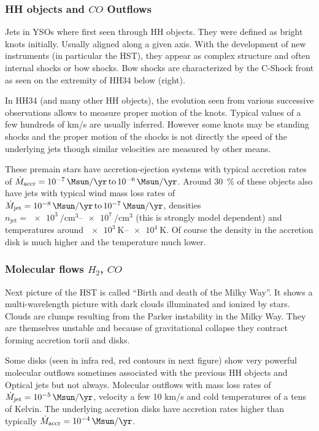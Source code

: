 \documentclass[10pt,a4paper,english]{article}
\newcommand\SIrangeto[2]{\SIrange[range-phrase=\,\text{to}\,]{#1}{#2}}
\begin{document}
\subsubsection{\texorpdfstring{HH objects and $CO$ Outflows}{HH objects and CO Outflows}}

Jets in YSOs where first seen through HH objects. They were defined as bright
knots initially. Usually aligned along a given axis. With the development of
new instruments (in particular the HST), they appear as complex structure and
often internal shocks or bow shocks. Bow shocks are characterized by the
C-Shock front as seen on the extremity of HH34 below (right).

In HH34 (and many other HH objects), the evolution seen from various successive
observations allows to measure proper motion of the knots. Typical values of a
few hundreds of km/s are usually inferred. However some knots may be standing
shocks and the proper motion of the shocks is not directly the speed of the
underlying jets though similar velocities are measured by other means.

These premain stars have accretion-ejection systems with typical accretion
rates of $\dot{M}_\mathrm{accr}=\SIrangeto{e-7}{e-6}{\Msun\per\yr}$. Around
\SI{30}{\percent} of these objects also have jets with typical wind mass loss
rates of $\dot{M}_\mathrm{jet}=\SIrangeto{e-8}{e-7}{\Msun\per\yr}$, densities
$n_\mathrm{jet}=\SIrangeto{e3}{e7}{\per\cubic\cm}$ (this is strongly model dependent)
and temperatures around $\SIrangeto{e3}{e4}{\kelvin}$. Of course the density in
the accretion disk is much higher and the temperature much lower.

\subsubsection{\texorpdfstring{Molecular flows $H_2$, $CO$}{Molecular flows H2, CO}}

Next picture of the HST is called “Birth and death of the Milky Way”. It shows
a multi-wavelength picture with dark clouds illuminated and ionized by stars.
Clouds are clumps resulting from the Parker instability in the Milky Way. They
are themselves unstable and because of gravitational collapse they contract
forming accretion torii and disks.

Some disks (seen in infra red, red contours in next figure) show very powerful
molecular outflows sometimes associated with the previous HH objects and
Optical jets but not always. Molecular outflows with mass loss rates of
$\dot{M}_\mathrm{jet}=\SI{e-5}{\Msun\per\yr}$, velocity a few 10 km/s and cold
temperatures of a tens of Kelvin. The underlying accretion disks have accretion
rates higher than typically $\dot{M}_\mathrm{accr}=\SI{e-4}{\Msun\per\yr}$.
\end{document}
